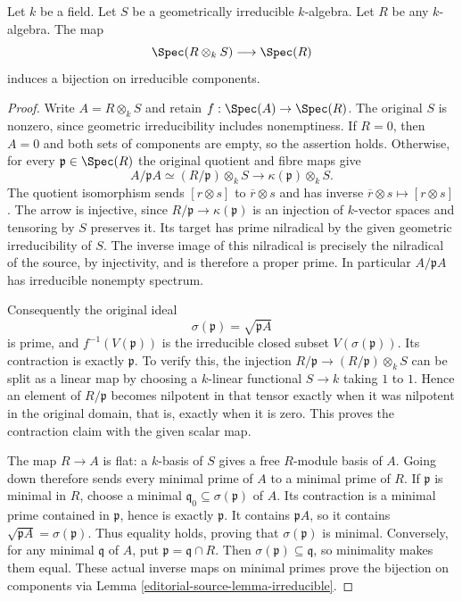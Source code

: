 \begin{lemma}
\label{editorial-source-lemma-geometrically-irreducible-any-base-change}
Let $k$ be a field.
Let $S$ be a geometrically irreducible $k$-algebra.
Let $R$ be any $k$-algebra.
The map
$$
\Spec(R \otimes_k S) \longrightarrow \Spec(R)
$$
induces a bijection on irreducible components.
\end{lemma}

\begin{proof}
Write $A=R\otimes_k S$ and retain
$f:\Spec(A)\to\Spec(R)$. The
original $S$ is nonzero, since
geometric irreducibility includes
nonemptiness. If $R=0$, then
$A=0$ and both sets of components
are empty, so the assertion
holds. Otherwise, for every
$\mathfrak p\in\Spec(R)$ the
original quotient and fibre maps
give
$$
A/\mathfrak pA\simeq(R/\mathfrak p)\otimes_k S
\longrightarrow\kappa(\mathfrak p)\otimes_k S.
$$
The quotient isomorphism sends
$[r\otimes s]$ to $\overline r\otimes s$
and has inverse
$\overline r\otimes s\mapsto[r\otimes s]$.
The arrow is injective, since
$R/\mathfrak p\to\kappa(\mathfrak p)$
is an injection of $k$-vector
spaces and tensoring by $S$
preserves it. Its target has
prime nilradical by the given
geometric irreducibility of $S$.
The inverse image of this
nilradical is precisely the
nilradical of the source, by
injectivity, and is therefore
a proper prime. In particular
$A/\mathfrak pA$ has irreducible
nonempty spectrum.

Consequently the original ideal
$$
\sigma(\mathfrak p)=\sqrt{\mathfrak pA}
$$
is prime, and $f^{-1}(V(\mathfrak p))$
is the irreducible closed subset
$V(\sigma(\mathfrak p))$.
Its contraction is exactly
$\mathfrak p$. To verify this,
the injection
$R/\mathfrak p\to(R/\mathfrak p)\otimes_k S$
can be split as a linear map
by choosing a $k$-linear
functional $S\to k$ taking
$1$ to $1$. Hence an element
of $R/\mathfrak p$ becomes
nilpotent in that tensor
exactly when it was nilpotent
in the original domain, that
is, exactly when it is zero.
This proves the contraction
claim with the given scalar
map.

The map $R\to A$ is flat: a
$k$-basis of $S$ gives a free
$R$-module basis of $A$.
Going down therefore sends
every minimal prime of $A$
to a minimal prime of $R$.
If $\mathfrak p$ is minimal
in $R$, choose a minimal
$\mathfrak q_0\subseteq\sigma(\mathfrak p)$
of $A$. Its contraction is
a minimal prime contained
in $\mathfrak p$, hence is
exactly $\mathfrak p$.
It contains $\mathfrak pA$,
so it contains
$\sqrt{\mathfrak pA}=\sigma(\mathfrak p)$.
Thus equality holds, proving
that $\sigma(\mathfrak p)$
is minimal. Conversely, for
any minimal $\mathfrak q$
of $A$, put
$\mathfrak p=\mathfrak q\cap R$.
Then $\sigma(\mathfrak p)\subseteq\mathfrak q$,
so minimality makes them equal.
These actual inverse maps on
minimal primes prove the
bijection on components via
Lemma \ref{editorial-source-lemma-irreducible}.


\end{proof}
